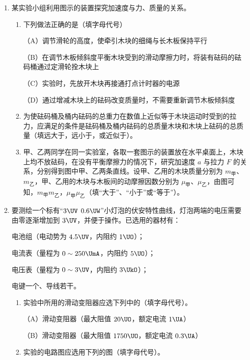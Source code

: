 \documentclass[\gkver]{gaokaozhenti}
\begin{document}
\begin{enumerate}
\begin{enumerate}
	\item
	某实验小组利用图示的装置探究加速度与力、质量的关系。


	\begin{enumerate}
		\item
		下列做法正确的是（填字母代号）

		（A）调节滑轮的高度，使牵引木块的细绳与长木板保持平行

		（B）在调节木板倾斜度平衡木块受到的滑动摩擦力时，将装有砝码的砝码桶通过定滑轮拴木块上

		（C）实验时，先放开木块再接通打点计时器的电源

		（D）通过增减木块上的砝码改变质量时，不需要重新调节木板倾斜度
		\item
		为使砝码桶及桶内砝码的总重力在数值上近似等于木块运动时受到的拉力，应满足的条件是砝码桶及桶内砝码的总质量木块和木块上砝码的总质量（填远大于，远小于，或近似于）。
		\item
		甲、乙两同学在同一实验室，各取一套图示的装置放在水平桌面上，木块上均不放砝码，在没有平衡摩擦力的情况下，研究加速度 $a$ 与拉力 $F$ 的关系，分别得到图中甲、乙两条直线。设甲、乙用的木块质量分别为 $m_{\text{甲}}$、$m_{\text{乙}}$，甲、乙用的木块与木板间的动摩擦因数分别为 $\mu_{\text{甲}}$、$\mu_{\text{乙}}$，由图可知，$m_{\text{甲}}$$m_{\text{乙}}$，$\mu_{\text{甲}}$$\mu_{\text{乙}}$（填“大于”、“小于”或“等于”）。

	\end{enumerate}
	\item
	要测绘一个标有“$3\UV$ $0.6\UW$”小灯泡的伏安特性曲线，灯泡两端的电压需要由零逐渐增加到 $3\UV$，并便于操作。已选用的器材有：

	电池组（电动势为 $4.5\UV$，内阻约 $1\UO$）；

	电流表（量程为 $0\sim250\UmA$，内阻约 $5\UO$）；

	电压表（量程为 $0\sim3\UV$，内阻约 $3\UkO$）；

	电键一个、导线若干。

	\begin{enumerate}
		\item
		实验中所用的滑动变阻器应选下列中的（填字母代号）。

		（A）滑动变阻器（最大阻值 $20\UO$，额定电流 $1\UA$）

		（B）滑动变阻器（最大阻值 $1750\UO$，额定电流 $0.3\UA$）
		\item
		实验的电路图应选用下列的图（填字母代号）。


\end{enumerate}
\end{enumerate}
\end{enumerate}
\end{document}
